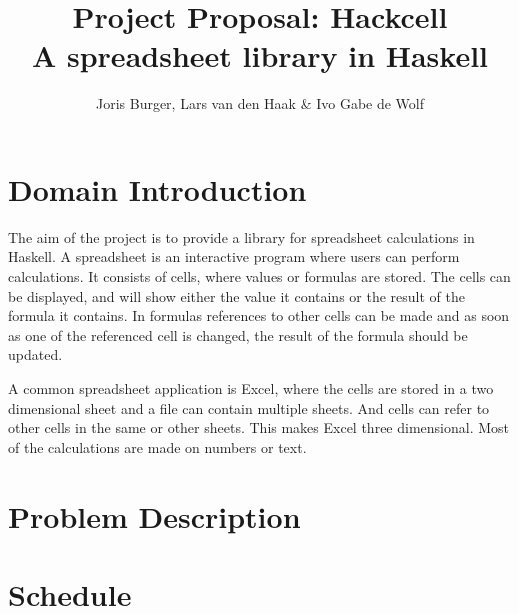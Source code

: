 \documentclass{article}
\title{
	\vskip -3cm
	Project Proposal: Hackcell \\
	\vskip 0.5cm
	\large{A spreadsheet library in Haskell}
}
\author{Joris Burger, Lars van den Haak \& Ivo Gabe de Wolf}
\begin{document}
	\maketitle
	\section{Domain Introduction}
	The aim of the project is to provide a library for spreadsheet calculations in Haskell. A spreadsheet is an interactive program where users can perform calculations. It consists of cells, where values or formulas are stored. The cells can be displayed, and will show either the value it contains or the result of the formula it contains. In formulas references to other cells can be made and as soon as one of the referenced cell is changed, the result of the formula should be updated.
	
	A common spreadsheet application is Excel, where the cells are stored in a two dimensional sheet and a file can contain multiple sheets. And cells can refer to other cells in the same or other sheets. This makes Excel three dimensional. Most of the calculations are made on numbers or text. 
	
	\section{Problem Description}
	
	\section{Schedule}
\end{document}
